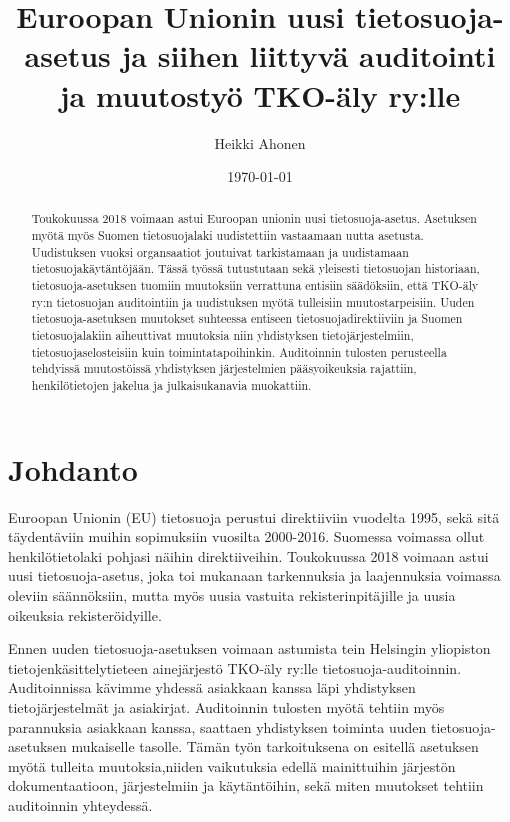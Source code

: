 \documentclass[finnish]{tktltiki}
\begin{document}
\singlespacing

\title{Euroopan Unionin uusi tietosuoja-asetus ja siihen liittyvä auditointi ja muutostyö TKO-äly ry:lle}
\author{Heikki Ahonen}
\date{\today}

\maketitle





\begin{abstract}

Toukokuussa 2018 voimaan astui Euroopan unionin uusi tietosuoja-asetus. Asetuksen myötä myös Suomen tietosuojalaki uudistettiin vastaamaan uutta asetusta. Uudistuksen vuoksi organsaatiot joutuivat tarkistamaan ja uudistamaan tietosuojakäytäntöjään. Tässä työssä tutustutaan sekä yleisesti tietosuojan historiaan, tietosuoja-asetuksen tuomiin muutoksiin verrattuna entisiin säädöksiin, että TKO-äly ry:n tietosuojan auditointiin ja uudistuksen myötä tulleisiin muutostarpeisiin. Uuden tietosuoja-asetuksen muutokset suhteessa entiseen tietosuojadirektiiviin ja Suomen tietosuojalakiin aiheuttivat muutoksia niin yhdistyksen tietojärjestelmiin, tietosuojaselosteisiin kuin toimintatapoihinkin. Auditoinnin tulosten perusteella tehdyissä muutostöissä yhdistyksen järjestelmien pääsyoikeuksia rajattiin, henkilötietojen jakelua ja julkaisukanavia muokattiin.

\end{abstract}

\mytableofcontents

\section{Johdanto}

Euroopan Unionin (EU) tietosuoja perustui direktiiviin vuodelta 1995, sekä sitä täydentäviin muihin sopimuksiin vuosilta 2000-2016. Suomessa voimassa ollut henkilötietolaki pohjasi näihin direktiiveihin. Toukokuussa 2018 voimaan astui uusi tietosuoja-asetus, joka toi mukanaan tarkennuksia ja laajennuksia voimassa oleviin säännöksiin, mutta myös uusia vastuita rekisterinpitäjille ja uusia oikeuksia rekisteröidyille.

Ennen uuden tietosuoja-asetuksen voimaan astumista tein Helsingin yliopiston tietojenkäsittelytieteen ainejärjestö TKO-äly ry:lle tietosuoja-auditoinnin. Auditoinnissa kävimme yhdessä asiakkaan kanssa läpi yhdistyksen tietojärjestelmät ja asiakirjat. Auditoinnin tulosten myötä tehtiin myös parannuksia asiakkaan kanssa, saattaen yhdistyksen toiminta uuden tietosuoja-asetuksen mukaiselle tasolle. Tämän työn tarkoituksena on esitellä asetuksen myötä tulleita muutoksia,niiden vaikutuksia edellä mainittuihin järjestön dokumentaatioon, järjestelmiin ja käytäntöihin, sekä miten muutokset tehtiin auditoinnin yhteydessä.
\end{document}
